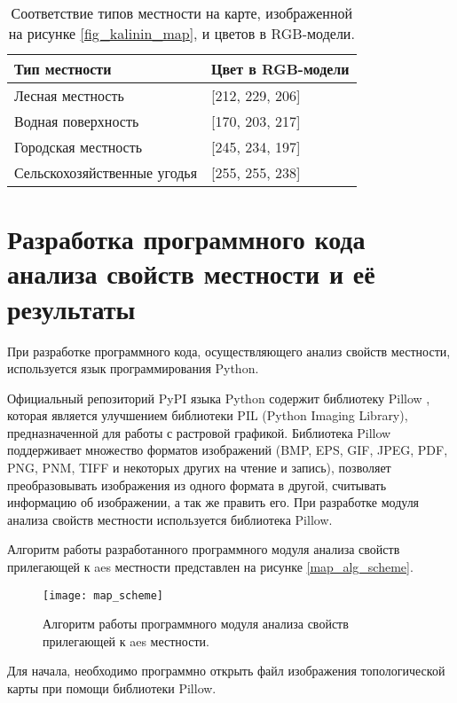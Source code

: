 \begin{table}[ht]
	\setlength{\extrarowheight}{1mm}
	\caption{Соответствие типов местности на карте, изображенной на рисунке \ref{fig_kalinin_map}, и цветов в RGB-модели.}
	\label{table_legend_map}
	\centering
    \begin{tabular}{|M{0.4\textwidth}|M{0.4\textwidth}|}
    \hline Тип местности & Цвет в RGB-модели \\
    \hline Лесная местность & [212, 229, 206] \\
    \hline Водная поверхность & [170, 203, 217] \\
    \hline Городская местность & [245, 234, 197] \\
    \hline Сельскохозяйственные угодья & [255, 255, 238] \\
    \hline 
    \end{tabular}
\end{table}

\section{Разработка программного кода анализа свойств местности и её результаты}

При разработке программного кода, осуществляющего анализ свойств местности, используется язык программирования Python. 

Официальный репозиторий PyPI языка Python содержит библиотеку Pillow \cite{pillow}, которая является улучшением 
библиотеки PIL (Python Imaging Library), предназначенной для работы с растровой графикой. Библиотека Pillow 
поддерживает множество форматов изображений (BMP, EPS, GIF, JPEG, PDF, PNG, PNM, TIFF и некоторых других на чтение и 
запись), позволяет преобразовывать изображения из одного формата в другой, считывать информацию об изображении, а так 
же править его. При разработке модуля анализа свойств местности используется библиотека Pillow.

Алгоритм работы разработанного программного модуля анализа свойств прилегающей к \ac{aes} местности представлен на 
рисунке \ref{map_alg_scheme}.

\begin{figure}[ht]
\centering
    \texttt{[image: map\_scheme]}
    \captionsetup{justification=centering}
    \caption{Алгоритм работы программного модуля анализа свойств прилегающей к \ac{aes} местности.}
    \label{fig_alg_map_scheme}
\end{figure}

Для начала, необходимо программно открыть файл изображения топологической карты при помощи библиотеки Pillow.

